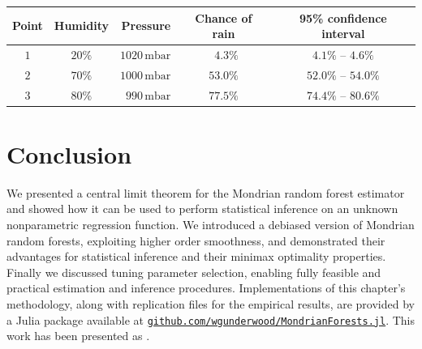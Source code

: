 \begin{table}
  \begin{center}
    \begin{tabular}{|c|c|r|c|c|}
      \hline
      \textbf{Point} & \textbf{Humidity} & \textbf{Pressure} &
      \textbf{Chance of rain} & \textbf{95\% confidence interval} \\
      \hline
      $1$ & $20\%$ & $1020\,\textrm{mbar}$ &
      $\phantom{0}4.3\%$ &
      \hspace*{-0mm}$4.1\%$ -- $4.6\%$ \\
      $2$ & $70\%$ & $1000\,\textrm{mbar}$ &
      $53.0\%$ &
      $52.0\%$ -- $54.0\%$ \\
      $3$ & $80\%$ & $990\,\textrm{mbar}$ &
      $77.5\%$ &
      $74.4\%$ -- $80.6\%$ \\
      \hline
    \end{tabular}
  \end{center}
\end{table}

\section{Conclusion}%
\label{sec:mondrian_conclusion}

We presented a central limit theorem for the Mondrian random forest
estimator and showed how it can be used to perform statistical inference
on an unknown nonparametric regression function.
We introduced a debiased version of Mondrian random forests, exploiting higher
order smoothness, and
demonstrated their advantages for statistical inference and their
minimax optimality properties.
Finally we discussed tuning parameter selection, enabling fully
feasible and practical estimation and inference procedures.
Implementations of this chapter's methodology,
along with replication files for the empirical results,
are provided by a Julia package available at
\href{https://github.com/WGUNDERWOOD/MondrianForests.jl}%
{\texttt{github.com/wgunderwood/MondrianForests.jl}}.
This work has been presented as
%
\cite{%
  underwood2024talkmichigan,%
  underwood2024talkillinois,%
  underwood2024talkpitt%
}.
